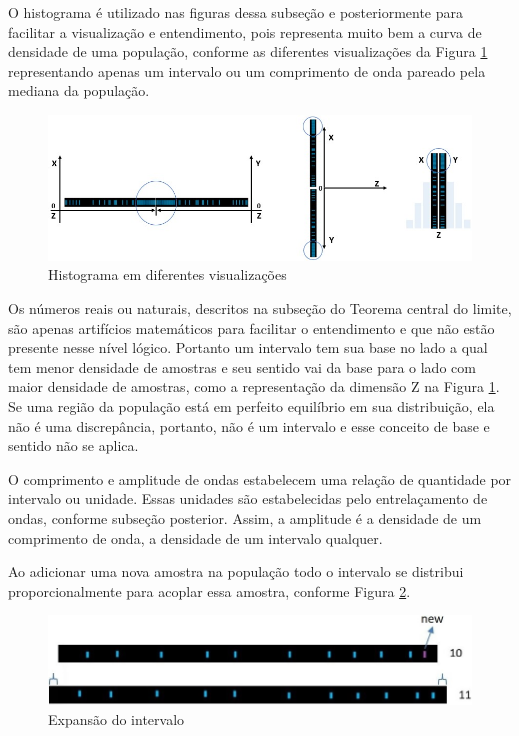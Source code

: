 O histograma é utilizado nas figuras dessa subseção e posteriormente para facilitar a visualização e entendimento, pois representa muito bem a curva de densidade de uma população, conforme as diferentes visualizações da Figura \ref{fig:consciousness_wave_histogram} representando apenas um intervalo ou um comprimento de onda pareado pela mediana da população.  
	\begin{figure}[H]
	\caption{Histograma em diferentes visualizações }
	\label{fig:consciousness_wave_histogram}
	\centering
	\includegraphics[scale=.7]{sections/images/consciousness_wave_histogram.jpg}
	\end{figure}

Os números reais ou naturais, descritos na subseção do Teorema central do limite, são apenas artifícios matemáticos para facilitar o entendimento e que não estão presente nesse nível lógico. Portanto um intervalo tem sua base no lado a qual tem menor densidade de amostras e seu sentido vai da base para o lado com maior densidade de amostras, como a representação da dimensão Z na Figura \ref{fig:consciousness_wave_histogram}. Se uma região da população está em perfeito equilíbrio em sua distribuição, ela não é uma discrepância, portanto, não é um intervalo e esse conceito de base e sentido não se aplica.

O comprimento e amplitude de ondas estabelecem uma relação de quantidade por intervalo ou unidade. Essas unidades são estabelecidas pelo entrelaçamento de ondas, conforme subseção posterior. Assim, a amplitude é a densidade de um comprimento de onda, a densidade de um intervalo qualquer.  

Ao adicionar uma nova amostra na população todo o intervalo se distribui proporcionalmente para acoplar essa amostra, conforme Figura \ref{fig:consciousness_space_volume_amplitude}.
	\begin{figure}[H]
	\caption{Expansão do intervalo}
	\label{fig:consciousness_space_volume_amplitude}
	\centering
	\includegraphics[scale=.5]{sections/images/consciousness_space_volume_amplitude.jpg}
	\end{figure}

